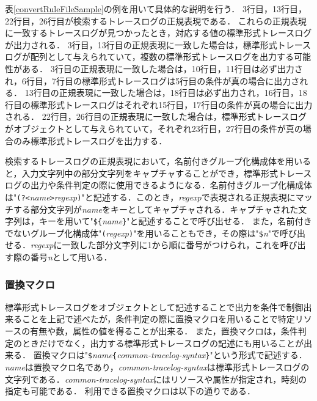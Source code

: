 表\ref{convertRuleFileSample}の例を用いて具体的な説明を行う．
3行目，13行目，22行目，26行目が検索するトレースログの正規表現である．
これらの正規表現に一致するトレースログが見つかったとき，対応する値の標準形式トレースログが出力される．
3行目，13行目の正規表現に一致した場合は，標準形式トレースログが配列として与えられていて，複数の標準形式トレースログを出力する可能性がある．
3行目の正規表現に一致した場合は，10行目，11行目は必ず出力され，6行目，7行目の標準形式トレースログは5行目の条件が真の場合に出力される．
13行目の正規表現に一致した場合は，18行目は必ず出力され，16行目，18行目の標準形式トレースログはそれぞれ15行目，17行目の条件が真の場合に出力される．
22行目，26行目の正規表現に一致した場合は，標準形式トレースログがオブジェクトとして与えられていて，それぞれ23行目，27行目の条件が真の場合のみ標準形式トレースログを出力する．

検索するトレースログの正規表現において，名前付きグループ化構成体を用いると，入力文字列中の部分文字列をキャプチャすることができ，標準形式トレースログの出力や条件判定の際に使用できるようになる．名前付きグループ化構成体は"\texttt{(?<}\textit{name}\texttt{>}\textit{regexp}\texttt{)}"と記述する．このとき，\textit{regexp}で表現される正規表現にマッチする部分文字列が\textit{name}をキーとしてキャプチャされる．キャプチャされた文字列は，キーを用いて"\verb|${|\textit{name}\verb|}|"と記述することで呼び出せる．
また，名前付きでないグループ化構成体"\texttt{(}\textit{regexp}\texttt{)}"を用いることもでき，その際は"\texttt{\$}\textit{n}"で呼び出せる．\textit{regexp}に一致した部分文字列に1から順に番号がつけられ，これを呼び出す際の番号\textit{n}として用いる．

\subsubsection{置換マクロ}

標準形式トレースログをオブジェクトとして記述することで出力を条件で制御出来ることを上記で述べたが，条件判定の際に置換マクロを用いることで特定リソースの有無や数，属性の値を得ることが出来る．
また，置換マクロは，条件判定のときだけでなく，出力する標準形式トレースログの記述にも用いることが出来る．
置換マクロは"\verb|$|{\it name}\verb|{|{\it common-tracelog-syntax}\verb|}|"という形式で記述する．{\it name}は置換マクロ名であり，{\it common-tracelog-syntax}は標準形式トレースログの文字列である．{\it common-tracelog-syntax}にはリソースや属性が指定され，時刻の指定も可能である．
利用できる置換マクロは以下の通りである．


